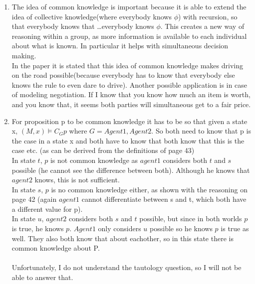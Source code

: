 \documentclass[12pt]{article} %
\begin{document}
\begin{enumerate}
    \item  The idea of common knowledge is important because it is able to
        extend the idea of collective knowledge(where everybody knows $\phi$) with recursion, so that
        everybody knows that \dots  everybody knows $\phi$.
        This creates a new way of reasoning within a group, as more information
        is available to each individual about what is known. In particular it
        helps with simultaneous decision making.
        \\
        In the paper it is stated that this idea of common knowledge makes
        driving on the road possible(because everybody has to know that
        everybody else knows the rule to even dare to drive).
        Another possible application is in case of modeling negotiation. If I know that
        you know how much an item  is worth, and you know that, it seems both parties
        will simultaneous get to a fair price.
    \item For proposition p to be common knowledge it has to be so that given a
        state x, $(M, x) \models C_G p$ where $G = {Agent 1, Agent 2}$. So both
        need to know that p is the case in a state x and both have to know that
        both know that this is the case etc. (as can be derived from the
        definitions of page 43)\\
        In state $t$, $p$ is not common knowledge as $agent 1$ considers both
        $t$ and $s$
        possible (he cannot see the difference between both). Although he knows
        that $agent 2$ knows, this is not sufficient.\\
        In state $s$, $p$ is no common knowledge either, as shown with the
        reasoning on page 42 (again $agent 1$ cannot differentiate between s and
        t, which both have a different value for p).\\
        In state $u$, $agent 2$ considers both $s$ and $t$ possible, but since in both
        worlds $p$ is true, he knows $p$. $Agent 1$ only considers $u$ possible so
        he knows $p$ is true as well. They also both know that about eachother,
        so in this state there is common knowledge about P.
        \\
        \\
        Unfortunately, I do not understand the tautology question, so I will not
        be able to answer that.
        

\end{enumerate}
\end{document}
